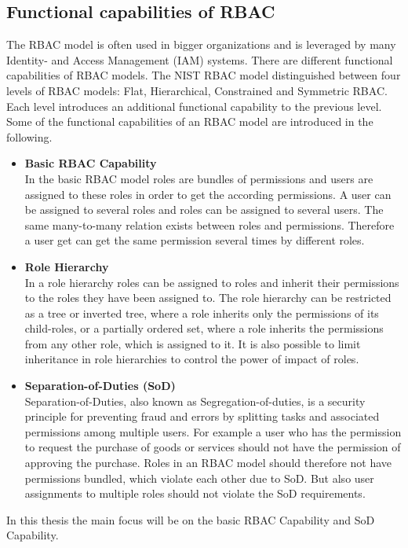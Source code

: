     \subsection{Functional capabilities of RBAC}
    The RBAC model is often used in bigger organizations\cite{o20102010} and is leveraged by many Identity- and Access Management (IAM) systems. There are different functional capabilities of RBAC models. The NIST RBAC model \cite{sandhu2000nist} distinguished between four levels of RBAC models: Flat, Hierarchical, Constrained and Symmetric RBAC. Each level introduces an additional functional capability to the previous level. Some of the functional capabilities of an RBAC model are introduced in the following.
    \begin{itemize}
        \item \textbf{Basic RBAC Capability}\\
        In the basic RBAC model roles are bundles of permissions and users are assigned to these roles in order to get the according permissions. A user can be assigned to several roles and roles can be assigned to several users. The same many-to-many relation exists between roles and permissions. Therefore a user get can get the same permission several times by different roles.
        \item \textbf{Role Hierarchy}\\
        In a role hierarchy roles can be assigned to roles and inherit their permissions to the roles they have been assigned to. The role hierarchy can be restricted as a tree or inverted tree, where a role inherits only the permissions of its child-roles, or a partially ordered set, where a role inherits the permissions from any other role, which is assigned to it. It is also possible to limit inheritance in role hierarchies to control the power of impact of roles.
        \item \textbf{Separation-of-Duties (SoD)}\\
        Separation-of-Duties, also known as Segregation-of-duties, is a security principle for preventing fraud and errors by splitting tasks and associated permissions among multiple users. For example a user who has the permission to request the purchase of goods or services should not have the permission of approving the purchase. Roles in an RBAC model should therefore not have permissions bundled, which violate each other due to SoD. But also user assignments to multiple roles should not violate the SoD requirements.
    \end{itemize}
    In this thesis the main focus will be on the basic RBAC Capability and SoD Capability.\\
    
